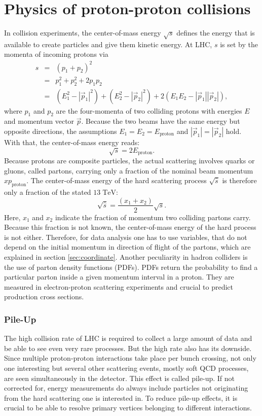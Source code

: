 \section{Physics of proton-proton collisions}
	In collision experiments, the center-of-mass energy $\sqrt{s}$ defines the energy that is available to create particles and give them kinetic energy. At LHC, $s$ is set by the momenta of incoming protons via
	\begin{eqnarray}
	s &=& (p_1 + p_2)^2 \\
	  &=& p_1^2 + p_2^2 + 2 p_1 p_2 \\
	  &=& (E_1^2 - |\vec{p}_1|^2 )  + (E_2^2 - |\vec{p}_2|^2 ) + 2 (E_1 E_2 - |\vec{p}_1| |\vec{p}_2| ),
	\end{eqnarray}
	where $p_1$ and $p_2$ are the four-momenta of two colliding protons with energies $E$ and momentum vector $\vec{p}$. Because the two beams have the same energy but opposite directions, the assumptions $E_1 = E_2 = E_\text{proton}$ and $|\vec{p}_1| = |\vec{p}_2|$ hold. With that, the center-of-mass energy reads:
	\begin{equation}
	\sqrt{s} = 2 E_\text{proton}.
	\end{equation}
	Because protons are composite particles, the actual scattering involves quarks or gluons, called partons, carrying only a fraction of the nominal beam momentum $x p_\text{proton}$. The center-of-mass energy of the hard scattering process $\sqrt{\hat{s}}$ is therefore only a fraction of the stated $13\;\text{TeV}$:
	\begin{equation}
	\sqrt{\hat{s}} = \frac{(x_1 + x_2)}{2} \sqrt{s}.
	\end{equation} 
	Here, $x_1$ and $x_2$ indicate the fraction of momentum two colliding partons carry. Because this fraction is not known, the center-of-mass energy of the hard process is not either. Therefore, for data analysis one has to use variables, that do not depend on the initial momentum in direction of flight of the partons, which are explained in section \ref{sec:coordinate}. Another peculiarity in hadron colliders is the use of parton density functions (PDFs). PDFs return the probability to find a particular parton inside a given momentum interval in a proton. They are measured in electron-proton scattering experiments \cite{pdf} and crucial to predict production cross sections.
		
\subsubsection{Pile-Up}
	The high collision rate of LHC is required to collect a large amount of data and be able to see even very rare processes. But the high rate also has its downside. Since multiple proton-proton interactions take place per bunch crossing, not only one interesting but several other scattering events, mostly soft QCD processes, are seen simultaneously in the detector. This effect is called pile-up. If not corrected for, energy measurements do always include particles not originating from the hard scattering one is interested in. To reduce pile-up effects, it is crucial to be able to resolve primary vertices belonging to different interactions.
